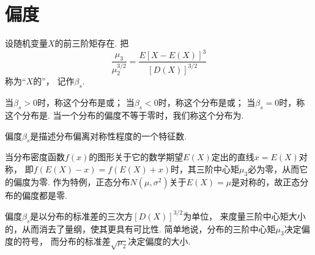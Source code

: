 \section{偏度}
\begin{definition}
设随机变量\(X\)的前三阶矩存在.
把\[
	\frac{\mu_3}{\mu_2^{3/2}}
	=\frac{E[X-E(X)]^3}{[D(X)]^{3/2}}
\]称为“\(X\)的”，
记作\(\beta_s\).

当\(\beta_s>0\)时，称这个分布是或；
当\(\beta_s<0\)时，称这个分布是或；
当\(\beta_s=0\)时，称这个分布是.
当一个分布的偏度不等于零时，我们称这个分布为.
\end{definition}

偏度\(\beta_s\)是描述分布偏离对称性程度的一个特征数.

当分布密度函数\(f(x)\)的图形关于它的数学期望\(E(X)\)定出的直线\(x=E(X)\)对称，
即\(f(E(X)-x)=f(E(X)+x)\)时，其三阶中心矩\(\mu_3\)必为零，从而它的偏度为零.
作为特例，正态分布\(N(\mu,\sigma^2)\)关于\(E(X)=\mu\)是对称的，故正态分布的偏度都是零.

偏度\(\beta_s\)是以分布的标准差的三次方\([D(X)]^{3/2}\)为单位，
来度量三阶中心矩大小的，从而消去了量纲，使其更具有可比性.
简单地说，分布的三阶中心矩\(\mu_3\)决定偏度的符号，
而分布的标准差\(\sqrt{\mu_2}\)决定偏度的大小.

